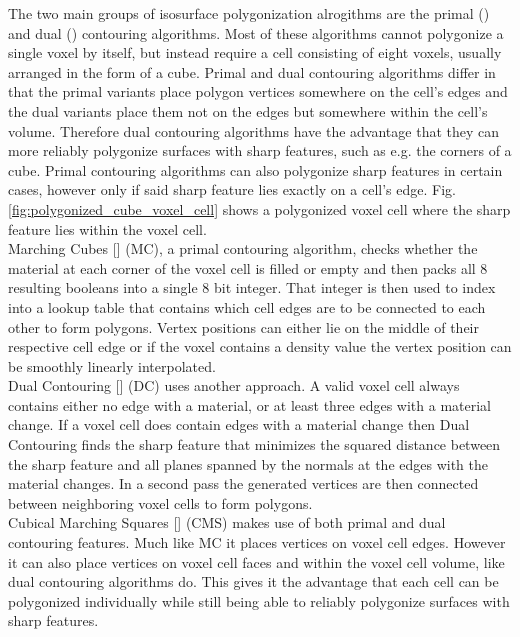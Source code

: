 The two main groups of isosurface polygonization alrogithms are the primal () and dual () contouring algorithms.
Most of these algorithms cannot polygonize a single voxel by itself, but instead require a cell consisting of eight voxels, usually arranged in the form
of a cube. Primal and dual contouring algorithms differ in that the primal variants place polygon vertices somewhere on the cell's edges and the dual variants
place them not on the edges but somewhere within the cell's volume. Therefore dual contouring algorithms have the advantage that they can more reliably polygonize
surfaces with sharp features, such as e.g. the corners of a cube. Primal contouring algorithms can also polygonize sharp features in certain cases, however only
if said sharp feature lies exactly on a cell's edge. Fig. \ref{fig:polygonized_cube_voxel_cell} shows a polygonized voxel cell where the sharp feature lies within
the voxel cell.\\
Marching Cubes [] (MC), a primal contouring algorithm, checks whether the material at each corner of the voxel cell is filled or empty and then 
packs all 8 resulting booleans into a single 8 bit integer. That integer is then used to index into a lookup table that contains which cell edges are to be connected to
each other to form polygons. Vertex positions can either lie on the middle of their respective cell edge or if the voxel contains a density value the vertex position
can be smoothly linearly interpolated.\\
Dual Contouring [] (DC) uses another approach. A valid voxel cell always contains either no edge with a material, or at least three edges with a material change. If a voxel cell
does contain edges with a material change then Dual Contouring finds the sharp feature that minimizes the squared distance between the sharp feature and all planes spanned
by the normals at the edges with the material changes. In a second pass the generated vertices are then connected between neighboring voxel cells to form polygons.\\
Cubical Marching Squares [] (CMS) makes use of both primal and dual contouring features. Much like MC it places vertices on voxel cell edges. However it can also place vertices
on voxel cell faces and within the voxel cell volume, like dual contouring algorithms do. This gives it the advantage that each cell can be polygonized individually while still being able to
reliably polygonize surfaces with sharp features.

